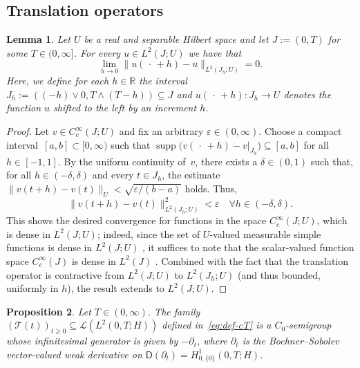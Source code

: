 \documentclass[reqno]{amsart}
\numberwithin{equation}{section}
\newcommand{\R}{\mathbb{R}}
\newcommand{\norm}[2]{     \| #1       \|_{ #2 }}
\newcommand{\from}{\colon}
\newtheorem{lemma}{Lemma}[section]
\newtheorem{proposition}[lemma]{Proposition}
\theoremstyle{remark}
\theoremstyle{definition}
\begin{document}
\subsection{Translation operators}\label{app:subsec:translation} 

\begin{lemma}\label{lem:translations} 
	Let $U$ be a real and separable Hilbert space and
	let $J := (0,T)$ for some $T \in (0,\infty]$.
	For every $u \in L^2(J; U)$ we have that 
	\[
	\lim_{h\to 0} 
	\norm{ u(\,\cdot\, + h) - u }{ L^2(J_h ; U) } 
	= 0.
	\] 
	Here, we define for each $h \in \R$ the interval
	$J_h := ((-h) \vee 0, T\wedge (T-h)) \subseteq J$ and
	$u(\,\cdot\, + h) \from J_h \to U$ 
	denotes the function $u$ shifted to the left 
	by an increment $h$. 
\end{lemma}

\begin{proof}
	Let $v \in C^\infty_c(J; U)$ and 
	fix an arbitrary 
	$\varepsilon\in(0,\infty)$. 
	Choose a compact 
	interval~$[a,b]\subset [0,\infty)$ 
	such that 
	$\operatorname{supp}\bigl( 
	v(\,\cdot\, + h) - v|_{J_h} 
	\bigr) \subseteq [a,b]$ 
	for all  
	$h\in[-1,1]$. 
	By the uniform continuity of~$v$, 
	there exists a $\delta\in(0,1)$ such that, 
	for all $h\in(-\delta,\delta)$ 
	and every $t\in J_h$, 
	the estimate 
	$\norm{v(t+h)-v(t)}{U} < \sqrt{\varepsilon/(b-a)}$ 
	holds. Thus,
	\[ 
	\norm{ v(t+h)-v(t) }{L^2(J_h;U)}^2 
	< 
	\varepsilon 
	\quad 
	\forall h\in (-\delta,\delta). 
	\] 
	This shows the desired convergence 
	for functions in the space $C^\infty_c(J; U)$,
	which is dense in $L^2(J;U)$;
	indeed, since the set of $U$-valued measurable simple functions is 
	dense in $L^2(J; U)$ \cite[Lemma~1.2.19(1)]{AnalysisInBanachSpacesI}, 
	it suffices to note
	that the scalar-valued function space $C_c^\infty(J)$ is dense in $L^2(J)$
	\cite[Corollary~2.30]{AdamsFournier2003}. 
	Combined with the fact that 
	the translation operator is contractive  
	from $L^2(J; U)$ to $L^2(J_h; U)$ 
	(and thus bounded, uniformly in $h$), 
	the result extends 
	to $L^2(J; U)$.
\end{proof}


\begin{proposition}\label{prop:translation-semigroup}
	Let $T\in(0,\infty)$. 
	The family 
	$(\mathcal T(t))_{t\ge0} \subseteq \mathscr L(L^2(0,T;H))$ 
	defined in~\eqref{eq:def-cT}  
	is a $C_0$-semigroup whose infinitesimal generator 
	is given by $-\partial_t$, 
	where $\partial_t$ is the Bochner--Sobolev 
	vector-valued weak derivative 
	on $\mathsf D(\partial_t) = H^1_{0,\{0\}}(0,T; H)$.
\end{proposition}
\end{document}
